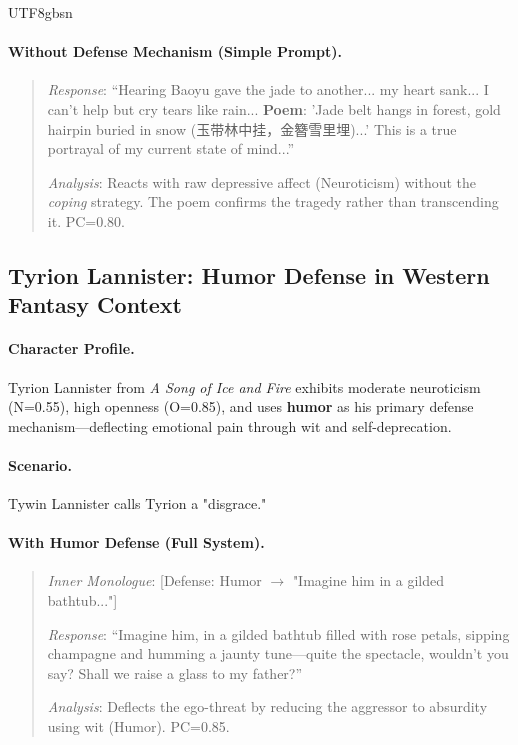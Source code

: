 \documentclass[11pt]{article}
\begin{document}
\begin{CJK*}{UTF8}{gbsn}
\paragraph{Without Defense Mechanism (Simple Prompt).}
\begin{quote}
\textit{Response}: ``Hearing Baoyu gave the jade to another... my heart sank... I can't help but cry tears like rain... \textbf{Poem}: 'Jade belt hangs in forest, gold hairpin buried in snow (玉带林中挂，金簪雪里埋)...' This is a true portrayal of my current state of mind...''

\textit{Analysis}: Reacts with raw depressive affect (Neuroticism) without the \textit{coping} strategy. The poem confirms the tragedy rather than transcending it. PC=0.80.
\end{quote}

\subsection{Tyrion Lannister: Humor Defense in Western Fantasy Context}

\paragraph{Character Profile.} Tyrion Lannister from \textit{A Song of Ice and Fire} exhibits moderate neuroticism (N=0.55), high openness (O=0.85), and uses \textbf{humor} as his primary defense mechanism---deflecting emotional pain through wit and self-deprecation.

\paragraph{Scenario.} Tywin Lannister calls Tyrion a "disgrace."

\paragraph{With Humor Defense (Full System).}
\begin{quote}
\textit{Inner Monologue}: [Defense: Humor $\rightarrow$ "Imagine him in a gilded bathtub..."]

\textit{Response}: ``Imagine him, in a gilded bathtub filled with rose petals, sipping champagne and humming a jaunty tune—quite the spectacle, wouldn't you say? Shall we raise a glass to my father?''

\textit{Analysis}: Deflects the ego-threat by reducing the aggressor to absurdity using wit (Humor). PC=0.85.
\end{quote}


\end{CJK*}
\end{document}
